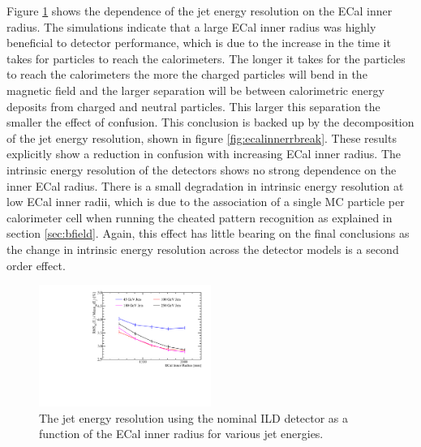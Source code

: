 Figure \ref{fig:ecalinnerr} shows the dependence of the jet energy resolution on the ECal inner radius.  The simulations indicate that a large ECal inner radius was highly beneficial to detector performance, which is due to the increase in the time it takes for particles to reach the calorimeters.  The longer it takes for the particles to reach the calorimeters the more the charged particles will bend in the magnetic field and the larger separation will be between calorimetric energy deposits from charged and neutral particles.  This larger this separation the smaller the effect of confusion.  This conclusion is backed up by the decomposition of the jet energy resolution, shown in figure \ref{fig:ecalinnerrbreak}.  These results explicitly show a reduction in confusion with increasing ECal inner radius.  The intrinsic energy resolution of the detectors shows no strong dependence on the inner ECal radius.  There is a small degradation in intrinsic energy resolution at low ECal inner radii, which is due to the association of a single MC particle per calorimeter cell when running the cheated pattern recognition as explained in section \ref{sec:bfield}.  Again, this effect has little bearing on the final conclusions as the change in intrinsic energy resolution across the detector models is a second order effect.  

\begin{figure}[h!]
\includegraphics[width=0.5\textwidth]{OptimisationStudies/Plots/JetEnergyResolutions/JER_vs_ECalInnerRadius.pdf}
\caption[The jet energy resolution using the nominal ILD detector as a function of the ECal inner radius for various jet energies.]{The jet energy resolution using the nominal ILD detector as a function of the ECal inner radius for various jet energies.}
\label{fig:ecalinnerr}
\end{figure}


